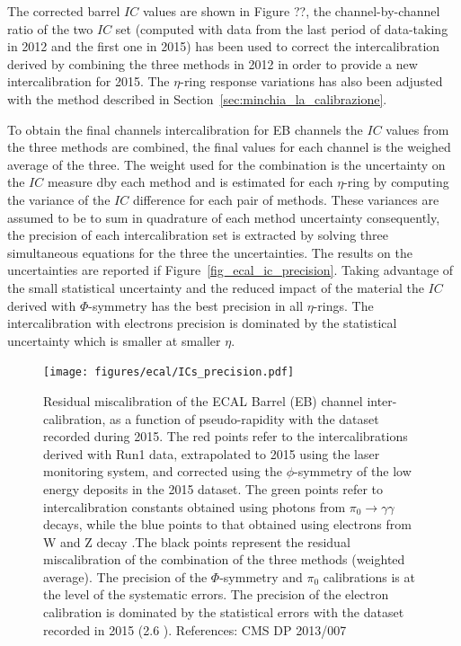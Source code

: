 The corrected barrel $IC$ values are shown in Figure ??, the channel-by-channel ratio of the two $IC$ set (computed with
data from the last period of data-taking in 2012 and the first one in 2015) has been used to correct the intercalibration
derived by combining the three methods in 2012 in order to provide a new intercalibration for 2015. The $\eta$-ring
response variations has also been adjusted with the method described in Section~\ref{sec:minchia_la_calibrazione}.

To obtain the final channels intercalibration for EB channels the $IC$ values from the three methods are combined, the final values
for each channel is the weighed average of the three. The weight used for the combination is the uncertainty on the $IC$
measure dby each method and is estimated for each $\eta$-ring by computing the variance of the $IC$ difference for each
pair of methods. These variances are assumed to be to sum in quadrature of each method uncertainty consequently,
the precision of each intercalibration set is extracted by solving three simultaneous equations for the three the uncertainties.
The results on the uncertainties are reported if Figure~\ref{fig_ecal_ic_precision}. Taking advantage of the
small statistical uncertainty and the reduced impact of the material the $IC$ derived with $\Phi$-symmetry has the best precision
in all $\eta$-rings. The intercalibration with electrons precision is dominated by the statistical uncertainty which
is smaller at smaller $\eta$.

\begin{figure}[!h]
  \centering
  \texttt{[image: figures/ecal/ICs\_precision.pdf]}
  \caption{Residual miscalibration of the ECAL Barrel (EB) channel inter-calibration, as a function of pseudo-rapidity with the dataset recorded during 2015. The red points refer to the intercalibrations derived with Run1 data, extrapolated to 2015 using the laser monitoring system, and corrected using the $\phi$-symmetry of the low energy deposits in the 2015 dataset. The green points refer to intercalibration constants obtained using photons from $\pi_0\to\gamma\gamma$ decays, while the blue points to that obtained using electrons from W and Z decay .The black points represent the residual miscalibration of the combination of the three methods (weighted average). The precision of the $\Phi$-symmetry and $\pi_0$ calibrations is at the level of the systematic errors. The precision of the electron calibration is dominated by the statistical errors with the dataset recorded in 2015 (2.6 \fbinv). References: CMS DP 2013/007}
  \label{fig:ecal_ic_precision}
\end{figure}

